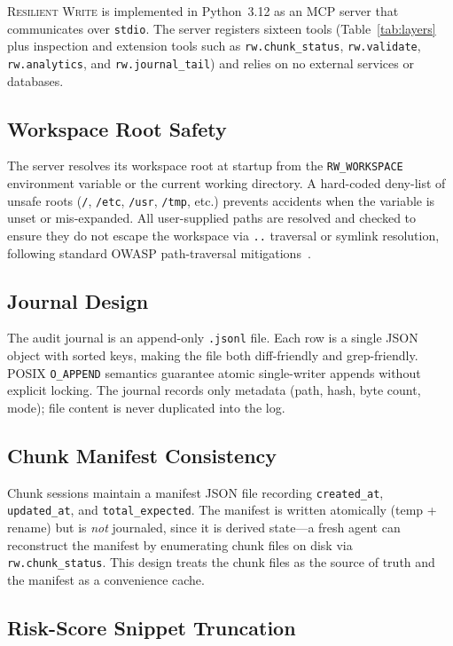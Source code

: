 \documentclass[11pt,twocolumn]{article}
\newcommand{\tool}[1]{\texttt{#1}}
\begin{document}
\textsc{Resilient Write} is implemented in Python~3.12 as an MCP
server that communicates over \texttt{stdio}.  The server registers
sixteen tools (Table~\ref{tab:layers} plus inspection and extension
tools such as \tool{rw.chunk\_status}, \tool{rw.validate},
\tool{rw.analytics}, and \tool{rw.journal\_tail}) and relies on no
external services or databases.

\subsection{Workspace Root Safety}

The server resolves its workspace root at startup from the
\texttt{RW\_WORKSPACE} environment variable or the current working
directory.  A hard-coded deny-list of unsafe roots
(\texttt{/}, \texttt{/etc}, \texttt{/usr}, \texttt{/tmp}, etc.)
prevents accidents when the variable is unset or mis-expanded.
All user-supplied paths are resolved and checked to ensure they do not
escape the workspace via \texttt{..} traversal or symlink resolution,
following standard OWASP path-traversal mitigations~\cite{owasp2021top10}.

\subsection{Journal Design}

The audit journal is an append-only \texttt{.jsonl} file.  Each row
is a single JSON object with sorted keys, making the file both
diff-friendly and grep-friendly.  POSIX \texttt{O\_APPEND} semantics
guarantee atomic single-writer appends without explicit locking.
The journal records only metadata (path, hash, byte count, mode);
file content is never duplicated into the log.

\subsection{Chunk Manifest Consistency}

Chunk sessions maintain a manifest JSON file recording
\texttt{created\_at}, \texttt{updated\_at}, and
\texttt{total\_expected}.  The manifest is written atomically
(temp + rename) but is \emph{not} journaled, since it is derived
state---a fresh agent can reconstruct the manifest by enumerating
chunk files on disk via \tool{rw.chunk\_status}.  This design treats
the chunk files as the source of truth and the manifest as a
convenience cache.

\subsection{Risk-Score Snippet Truncation}
\end{document}
